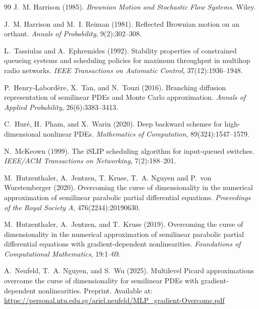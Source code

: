 \documentclass[11pt]{article}
\theoremstyle{definition}
\theoremstyle{plain}
\begin{document}
\begin{appendices}
\begin{thebibliography}{99}
 J.~M. Harrison (1985). \newblock \emph{Brownian Motion and Stochastic Flow Systems}. \newblock Wiley.

 J.~M. Harrison and M.~I. Reiman (1981). \newblock Reflected Brownian motion on an orthant. \newblock \emph{Annals of Probability}, 9(2):302--308.

 L.~Tassiulas and A.~Ephremides (1992). \newblock Stability properties of constrained queueing systems and scheduling policies for maximum throughput in multihop radio networks. \newblock \emph{IEEE Transactions on Automatic Control}, 37(12):1936--1948.

 P.~Henry-Labord\`ere, X.~Tan, and N.~Touzi (2016). \newblock Branching diffusion representation of semilinear PDEs and Monte Carlo approximation. \newblock \emph{Annals of Applied Probability}, 26(6):3383--3413.

 C.~Hur\'e, H.~Pham, and X.~Warin (2020). \newblock Deep backward schemes for high-dimensional nonlinear PDEs. \newblock \emph{Mathematics of Computation}, 89(324):1547--1579.

 N.~McKeown (1999). \newblock The iSLIP scheduling algorithm for input-queued switches. \newblock \emph{IEEE/ACM Transactions on Networking}, 7(2):188--201.

 M.~Hutzenthaler, A.~Jentzen, T. Kruse, T.~A. Nguyen and P.~von Wurstemberger (2020). \newblock Overcoming the curse of dimensionality in the numerical approximation of semilinear parabolic partial differential equations. \newblock \emph{Proceedings of the Royal Society A}, 476(2244):20190630. %

 M.~Hutzenthaler, A.~Jentzen, and T.~Kruse (2019). \newblock Overcoming the curse of dimensionality in the numerical approximation of semilinear parabolic partial differential equations with gradient-dependent nonlinearities. \newblock \emph{Foundations of Computational Mathematics}, 19:1--69. %

 A.~Neufeld, T.~A. Nguyen, and S.~Wu (2025). \newblock Multilevel Picard approximations overcome the curse of dimensionality for semilinear PDEs with gradient-dependent nonlinearities. \newblock Preprint. Available at: \url{https://personal.ntu.edu.sg/ariel.neufeld/MLP_gradient-Overcome.pdf}


\end{thebibliography}
\end{appendices}
\end{document}
